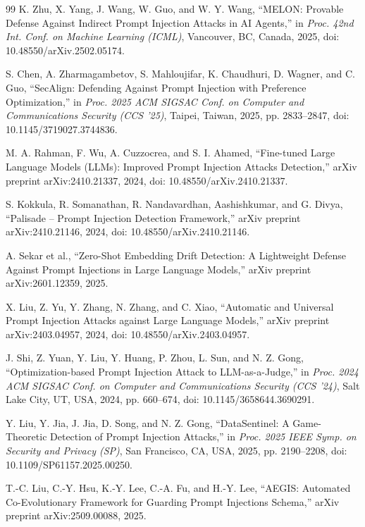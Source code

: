 \documentclass[12pt, letterpaper]{article}   %
\begin{document}
\begin{thebibliography}{99}
K. Zhu, X. Yang, J. Wang, W. Guo, and W. Y. Wang, ``MELON: Provable Defense Against Indirect Prompt Injection Attacks in AI Agents,'' in \textit{Proc. 42nd Int. Conf. on Machine Learning (ICML)}, Vancouver, BC, Canada, 2025, doi: 10.48550/arXiv.2502.05174.

S. Chen, A. Zharmagambetov, S. Mahloujifar, K. Chaudhuri, D. Wagner, and C. Guo, ``SecAlign: Defending Against Prompt Injection with Preference Optimization,'' in \textit{Proc. 2025 ACM SIGSAC Conf. on Computer and Communications Security (CCS '25)}, Taipei, Taiwan, 2025, pp. 2833--2847, doi: 10.1145/3719027.3744836.

M. A. Rahman, F. Wu, A. Cuzzocrea, and S. I. Ahamed, ``Fine-tuned Large Language Models (LLMs): Improved Prompt Injection Attacks Detection,'' arXiv preprint arXiv:2410.21337, 2024, doi: 10.48550/arXiv.2410.21337.

S. Kokkula, R. Somanathan, R. Nandavardhan, Aashishkumar, and G. Divya, ``Palisade -- Prompt Injection Detection Framework,'' arXiv preprint arXiv:2410.21146, 2024, doi: 10.48550/arXiv.2410.21146.

A. Sekar et al., ``Zero-Shot Embedding Drift Detection: A Lightweight Defense Against Prompt Injections in Large Language Models,'' arXiv preprint arXiv:2601.12359, 2025.

X. Liu, Z. Yu, Y. Zhang, N. Zhang, and C. Xiao, ``Automatic and Universal Prompt Injection Attacks against Large Language Models,'' arXiv preprint arXiv:2403.04957, 2024, doi: 10.48550/arXiv.2403.04957.

J. Shi, Z. Yuan, Y. Liu, Y. Huang, P. Zhou, L. Sun, and N. Z. Gong, ``Optimization-based Prompt Injection Attack to LLM-as-a-Judge,'' in \textit{Proc. 2024 ACM SIGSAC Conf. on Computer and Communications Security (CCS '24)}, Salt Lake City, UT, USA, 2024, pp. 660--674, doi: 10.1145/3658644.3690291.

Y. Liu, Y. Jia, J. Jia, D. Song, and N. Z. Gong, ``DataSentinel: A Game-Theoretic Detection of Prompt Injection Attacks,'' in \textit{Proc. 2025 IEEE Symp. on Security and Privacy (SP)}, San Francisco, CA, USA, 2025, pp. 2190--2208, doi: 10.1109/SP61157.2025.00250.

T.-C. Liu, C.-Y. Hsu, K.-Y. Lee, C.-A. Fu, and H.-Y. Lee, ``AEGIS: Automated Co-Evolutionary Framework for Guarding Prompt Injections Schema,'' arXiv preprint arXiv:2509.00088, 2025.

\end{thebibliography}
\endgroup
\end{document}
